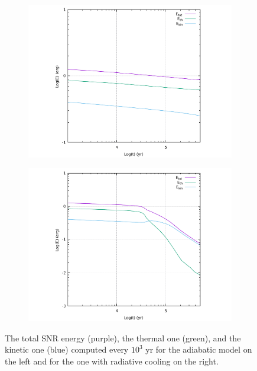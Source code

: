 \documentclass{article}
\begin{document}
\begin{figure}[H]
	\begin{subfigure}{0.5 \linewidth}
		\centering
		\includegraphics[width=1 \linewidth]{energy.pdf}
	\end{subfigure}
	\begin{subfigure}{0.5 \linewidth}
		\centering
		\includegraphics[width=1 \linewidth]{energycool.pdf}
	\end{subfigure}
	\caption{The total SNR energy (purple), the thermal one (green), and the kinetic one (blue) computed every $10^3$ yr for the adiabatic model on the left and for the one with radiative cooling on the right.}

	\label{fig:energy}
\end{figure}
\end{document}

